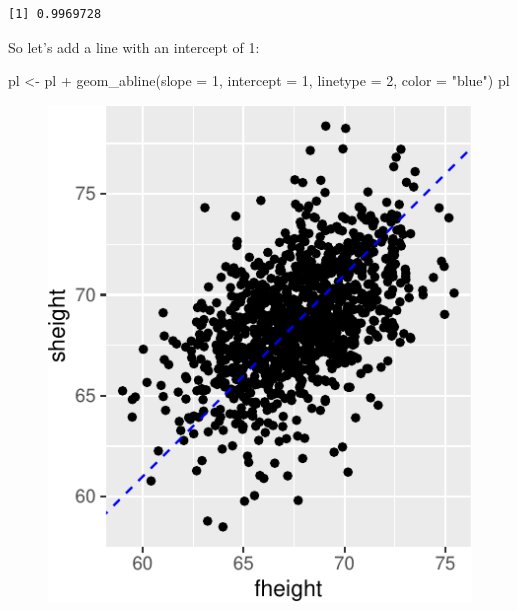 \documentclass[
  letterpaper,
  DIV=11,
  numbers=noendperiod]{scrreprt}
\newenvironment{Shaded}{\begin{snugshade}}{\end{snugshade}}
\newcommand{\AttributeTok}[1]{\textcolor[rgb]{0.40,0.45,0.13}{#1}}
\newcommand{\CommentTok}[1]{\textcolor[rgb]{0.37,0.37,0.37}{#1}}
\newcommand{\DecValTok}[1]{\textcolor[rgb]{0.68,0.00,0.00}{#1}}
\newcommand{\FunctionTok}[1]{\textcolor[rgb]{0.28,0.35,0.67}{#1}}
\newcommand{\NormalTok}[1]{\textcolor[rgb]{0.00,0.23,0.31}{#1}}
\newcommand{\OtherTok}[1]{\textcolor[rgb]{0.00,0.23,0.31}{#1}}
\newcommand{\SpecialCharTok}[1]{\textcolor[rgb]{0.37,0.37,0.37}{#1}}
\newcommand{\StringTok}[1]{\textcolor[rgb]{0.13,0.47,0.30}{#1}}
\begin{document}
\begin{Shaded}
\end{Shaded}

\begin{verbatim}
[1] 0.9969728
\end{verbatim}

So let's add a line with an intercept of 1:

\begin{Shaded}
\begin{Highlighting}[]
\NormalTok{pl }\OtherTok{\textless{}{-}}\NormalTok{ pl }\SpecialCharTok{+} \FunctionTok{geom\_abline}\NormalTok{(}\AttributeTok{slope =} \DecValTok{1}\NormalTok{, }\AttributeTok{intercept =} \DecValTok{1}\NormalTok{, }\AttributeTok{linetype =} \DecValTok{2}\NormalTok{, }\AttributeTok{color =} \StringTok{"blue"}\NormalTok{)}
\NormalTok{pl}
\end{Highlighting}
\end{Shaded}

\begin{figure}[H]

{\centering \includegraphics{./08-linearreg_files/figure-pdf/unnamed-chunk-5-1.pdf}

}

\end{figure}
\end{document}
